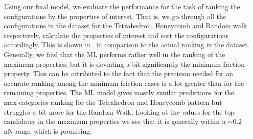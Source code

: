 Using our final model, we evaluate the performance for the task of ranking the configurations by the properties of interest. That is, we go through all the configurations in the dataset for the Tetrahedron, Honeycomb and Random walk respectively, calculate the properties of interest and sort the configurations accordingly. This is shown in~ in comparison to the actual ranking in the dataset. Generally, we find that the
\acrshort{ML} performs rather well in the ranking of the maximum properties, but it is deviating a bit significantly the minimum friction
property. This can be attributed to the fact that the precision needed for an
accurate ranking among the minimum friction cases is a lot greater than for the
remaining properties. The \acrshort{ML} model gives mostly similar predictions
for the max-categories ranking for the Tetrahedron and Honeycomb pattern but
struggles a bit more for the Random Walk. Looking at the values for the top
candidates in the maximum properties we see that it is generally within a
$\sim 0.2$ nN range which is promising. 


%
%
%
%



